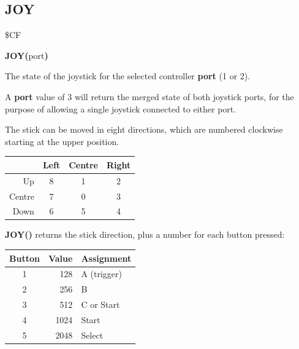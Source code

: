 \subsection{JOY}
\begin{description}[leftmargin=2cm,style=nextline]
\item [Token:]    \$CF

\item [Format:]   {\bf JOY(}port{\bf)}

\item [Returns:]  The state of the joystick for the selected controller {\bf port} (1 or 2).

                  A {\bf port} value of 3 will return the merged state of both joystick ports, for the purpose of allowing a single joystick connected to either port.

                  The stick can be moved in eight directions, which are numbered clockwise starting at the upper position.

                  \begin{center}
                  {\setlength{\tabcolsep}{1mm}
                  \begin{tabular}{|r|c|c|c|}
                  \hline
                  &  {\bf Left}  & {\bf Centre} & {\bf Right} \\
                  \hline
                  Up     &  8 &    1  & 2 \\
                  Centre &  7 &    0  & 3 \\
                  Down   &  6 &    5  & 4 \\
                  \hline
                  \end{tabular}
                  }
                  \end{center}

                  {\bf JOY()} returns the stick direction, plus a number for each button pressed:

                  \begin{center}
                  \begin{tabular}{|c|r|l|}
                  \hline
                  {\bf Button} & {\bf Value} & {\bf Assignment} \\
                  \hline
                  1 & 128 & A (trigger) \\
                  2 & 256 & B \\
                  3 & 512 & C or Start \\
                  4 & 1024 & Start \\
                  5 & 2048 & Select \\
                  \hline
                  \end{tabular}
                  \end{center}


\end{description}
